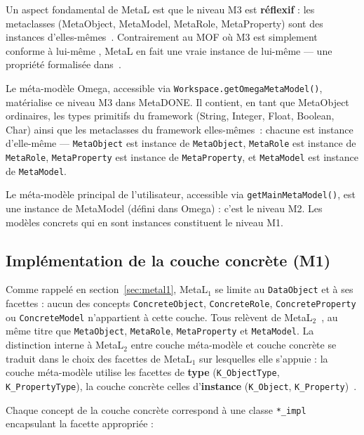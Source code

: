 Un aspect fondamental de MetaL est que le niveau M3 est \textbf{réflexif} : les
metaclasses (MetaObject, MetaModel, MetaRole, MetaProperty) sont des instances
d'elles-mêmes~\cite{englebert_metal2}. Contrairement au MOF où M3 est
simplement \og conforme à lui-même \fg{}, MetaL en fait une \og vraie instance de
lui-même \fg{} --- une propriété formalisée dans~\cite{englebert_metal2}.

Le méta-modèle Omega, accessible via \texttt{Workspace.getOmegaMetaModel()},
matérialise ce niveau M3 dans MetaDONE. Il contient, en tant que MetaObject
ordinaires, les types primitifs du framework (String, Integer, Float, Boolean,
Char) ainsi que les metaclasses du framework elles-mêmes~: chacune est instance
d'elle-même --- \texttt{MetaObject} est instance de \texttt{MetaObject},
\texttt{MetaRole} est instance de \texttt{MetaRole}, \texttt{MetaProperty} est
instance de \texttt{MetaProperty}, et \texttt{MetaModel} est instance de
\texttt{MetaModel}.

Le méta-modèle principal de l'utilisateur, accessible via
\texttt{getMainMetaModel()}, est une instance de MetaModel (défini dans Omega) :
c'est le niveau M2. Les modèles concrets qui en sont instances constituent le
niveau M1.

\subsection{Implémentation de la couche concrète (M1)}
\label{sec:impl-concret}

Comme rappelé en section~\ref{sec:metal1}, MetaL$_1$ se limite au \texttt{DataObject}
et à ses facettes : aucun des concepts \texttt{ConcreteObject}, \texttt{ConcreteRole},
\texttt{ConcreteProperty} ou \texttt{ConcreteModel} n'appartient à cette couche. Tous
relèvent de MetaL$_2$~\cite{englebert_metal2}, au même titre que \texttt{MetaObject},
\texttt{MetaRole}, \texttt{MetaProperty} et \texttt{MetaModel}. La distinction interne à
MetaL$_2$ entre couche méta-modèle et couche concrète se traduit dans le choix des facettes
de MetaL$_1$ sur lesquelles elle s'appuie : la couche méta-modèle utilise les facettes de
\textbf{type} (\texttt{K\_ObjectType}, \texttt{K\_PropertyType}), la couche concrète celles
d'\textbf{instance} (\texttt{K\_Object}, \texttt{K\_Property})~\cite{englebert_metal1}.

Chaque concept de la couche concrète correspond à une classe \texttt{*\_impl} encapsulant
la facette appropriée :

